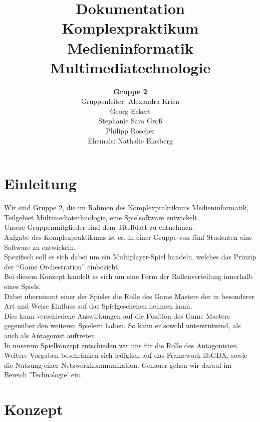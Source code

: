 \documentclass[10pt,a4paper,notitlepage]{scrreprt}
\begin{document}
	
	\pagestyle{headings}
	\onehalfspacing
	\title{Dokumentation \\ Komplexpraktikum Medieninformatik \\ Multimediatechnologie}
	\author{\textbf{Gruppe 2} \\Gruppenleiter: Alexandra Krien \\  Georg Eckert \\ Stephanie Sara Groß \\ Philipp Roscher \\ Ehemals: Nathalie Blasberg   }
	\maketitle
	\tableofcontents


	\chapter{Einleitung}

	Wir sind Gruppe 2, die im Rahmen des Komplexpraktikums Medieninformatik, Teilgebiet Multimediatechnologie, eine Spielsoftware entwickelt.\\ 
	Unsere Gruppenmitglieder sind dem Titelblatt zu entnehmen.\\
	Aufgabe des Komplexpraktikums ist es, in einer Gruppe von fünf Studenten eine Software zu entwickeln.\\
	Spezifisch soll es sich dabei um ein Multiplayer-Spiel handeln, welches das Prinzip der \enquote{Game Orchestration} einbezieht.\\
	Bei diesem Konzept handelt es sich um eine Form der Rollenverteilung innerhalb eines Spiels.\\
	Dabei übernimmt einer der Spieler die Rolle des Game Masters der in besonderer Art und Weise Einfluss auf das Spielgeschehen nehmen kann.\\
	Dies kann verschiedene Auswirkungen auf die Position des Game Masters gegenüber den weiteren Spielern haben. So kann er sowohl unterstützend, als auch als Antagonist auftreten.\\
	In unserem Spielkonzept entschieden wir uns für die Rolle des Antagonisten.\\
	Weitere Vorgaben beschränken sich lediglich auf das Framework libGDX, sowie die Nutzung einer  Netzwerkkommunikation. Genauer gehen wir darauf im Bereich 'Technologie' ein.\\

	\chapter{Konzept}
\end{document}
